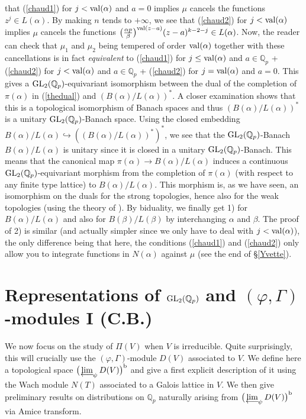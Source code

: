 \documentclass[11pt]{amsart}
\def\limproj{\mathop{\oalign{{\rm lim}\cr 
\hidewidth$\longleftarrow$\hidewidth\cr}}}
\def\Q{{\mathbb Q}_p}
\def\G{{\rm GL}_2(\Q)}
\begin{document}
that (\ref{chaud1}) for $j<{\rm val}(\alpha)$ and $a=0$ implies $\mu$
cancels the functions $z^j\in L(\alpha)$. By making $n$ tends to
$+\infty$, we see that (\ref{chaud2}) for $j<{\rm val}(\alpha)$
implies $\mu$ cancels the functions $\big(\frac{\alpha
  p}{\beta}\big)^{{\rm val}(z-a)}(z-a)^{k-2-j}\in L(\alpha)$. Now, the
reader can check that $\mu_1$ and $\mu_2$ being tempered of order
${\rm val}(\alpha)$ together with these cancellations is in fact {\it
  equivalent} to (\ref{chaud1}) for $j\leq {\rm val}(\alpha)$ and
$a\in \Q$ + (\ref{chaud2}) for $j<{\rm val}(\alpha)$ and $a\in \Q$ +
(\ref{chaud2}) for $j={\rm val}(\alpha)$ and $a=0$. This gives a
$\G$-equivariant isomorphism between the dual of the completion of
$\pi(\alpha)$ in (\ref{thedual}) and $(B(\alpha)/L(\alpha))^*$. A
closer examination shows that this is a topological isomorphism of
Banach spaces and thus $(B(\alpha)/L(\alpha))^*$ is a unitary
$\G$-Banach space. Using the closed embedding
$B(\alpha)/L(\alpha)\hookrightarrow ((B(\alpha)/L(\alpha))^*)^*$, we
see that the $\G$-Banach $B(\alpha)/L(\alpha)$ is unitary since it is
closed in a unitary $\G$-Banach. This means that the canonical map
$\pi(\alpha)\rightarrow B(\alpha)/L(\alpha)$ induces a continuous
$\G$-equivariant morphism from the completion of $\pi(\alpha)$ (with
respect to any finite type lattice) to $B(\alpha)/L(\alpha)$. This
morphism is, as we have seen, an isomorphism on the duals for the
strong topologies, hence also for the weak topologies (using the
theory of \cite{ST3}). By biduality, we finally get 1) for
$B(\alpha)/L(\alpha)$ and also for $B(\beta)/L(\beta)$ by
interchanging $\alpha$ and $\beta$. The proof of 2) is similar (and
actually simpler since we only have to deal with $j<{\rm
  val}(\alpha)$), the only difference being that here, the conditions
(\ref{chaud1}) and (\ref{chaud2}) only allow you to integrate
functions in $N(\alpha)$ against $\mu$ (see the end of
\S\ref{Yvette}).   
 
 
\section{Representations of $\G$ and $(\varphi,\Gamma)$-mod\-ules I (C.B.)} 
We now focus on the study of $\Pi(V)$ when $V$ is irreducible. Quite
surprisingly, this will crucially use the $(\varphi,\Gamma)$-module
$D(V)$ associated to $V$. We define here a topological space
$\big(\limproj_{\psi}D(V)\big)^{\rm b}$ and give a first explicit
description of it using the Wach module $N(T)$ associated to a Galois
lattice in $V$. We then give preliminary results on distributions on
$\Q$ naturally arising from $\big(\limproj_{\psi}D(V)\big)^{\rm b}$
via Amice transform.  
 
\end{document}

